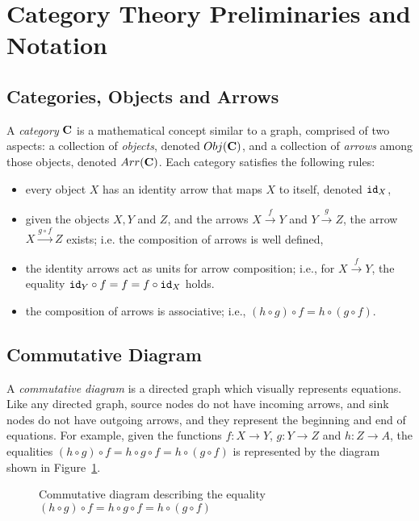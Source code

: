 \section{Category Theory Preliminaries and Notation}

\subsection{Categories, Objects and Arrows}
A \emph{category} $\AsCategory{C}$ is a mathematical concept similar to a graph, comprised of two aspects: a collection of \emph{objects}, denoted $Obj(\AsCategory{C})$, and a collection of \emph{arrows} among those objects, denoted $Arr(\AsCategory{C})$. Each category satisfies the following  rules:
\begin{itemize}
    \item every object $X$ has an identity arrow that maps $X$ to itself, denoted ${\texttt{id}}_X$,
    \item given the objects $X, Y$ and $Z$, and the arrows $X\xrightarrow{f}Y$ and $Y\xrightarrow{g}Z$, the arrow $X\xrightarrow{g\circ f}Z$ exists; i.e. the composition of arrows is well defined,
    \item the identity arrows act as units for arrow composition; i.e., for $X\xrightarrow{f}Y$, the equality ${\texttt{id}}_{Y}\circ f=f=f\circ {\texttt{id}}_{X}$ holds.
    \item the composition of arrows is associative; i.e., $(h\circ g)\circ f = h \circ (g\circ f)$.
\end{itemize}

\subsection{Commutative Diagram}
A \emph{commutative diagram} is a directed graph which visually represents equations. Like any directed graph, source nodes do not have incoming arrows, and sink nodes do not have outgoing arrows, and they represent the beginning and end of equations. For example, given the functions $f\colon X\rightarrow Y$, $g\colon Y\rightarrow Z$ and $h\colon Z\rightarrow A$, the equalities $(h\circ g)\circ f= h\circ g \circ f= h \circ (g\circ f)$ is represented by the diagram shown in Figure~\ref{fig:Preliminaries:CommutativeDiagram}.

\begin{figure}[t] 
    \centering
    \caption{Commutative diagram describing the equality $(h\circ g)\circ f= h\circ g \circ f= h \circ (g\circ f)$}
    \label{fig:Preliminaries:CommutativeDiagram} 
\end{figure}
